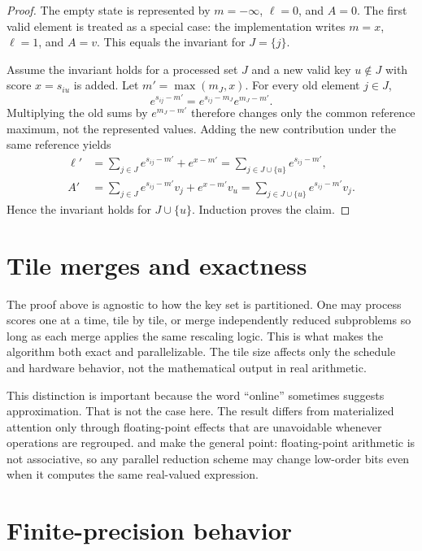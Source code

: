 \begin{proof}
The empty state is represented by $m=-\infty$, $\ell=0$, and $A=0$. The first valid element is treated as a special case: the implementation writes $m=x$, $\ell=1$, and $A=v$. This equals the invariant for $J=\{j\}$.

Assume the invariant holds for a processed set $J$ and a new valid key $u\notin J$ with score $x=s_{iu}$ is added. Let $m'=\max(m_J,x)$. For every old element $j\in J$,
\begin{equation}
  e^{s_{ij}-m'} = e^{s_{ij}-m_J} e^{m_J-m'}.
\end{equation}
Multiplying the old sums by $e^{m_J-m'}$ therefore changes only the common reference maximum, not the represented values. Adding the new contribution under the same reference yields
\begin{align}
  \ell' &= \sum_{j\in J} e^{s_{ij}-m'} + e^{x-m'}
        = \sum_{j\in J\cup\{u\}} e^{s_{ij}-m'}, \\
  A' &= \sum_{j\in J} e^{s_{ij}-m'} v_j + e^{x-m'} v_u
      = \sum_{j\in J\cup\{u\}} e^{s_{ij}-m'} v_j.
\end{align}
Hence the invariant holds for $J\cup\{u\}$. Induction proves the claim.
\end{proof}

\section{Tile merges and exactness}

The proof above is agnostic to how the key set is partitioned. One may process scores one at a time, tile by tile, or merge independently reduced subproblems so long as each merge applies the same rescaling logic. This is what makes the algorithm both exact and parallelizable. The tile size affects only the schedule and hardware behavior, not the mathematical output in real arithmetic.

This distinction is important because the word ``online'' sometimes suggests approximation. That is not the case here. The result differs from materialized attention only through floating-point effects that are unavoidable whenever operations are regrouped. \citet{goldberg1991floating} and \citet{higham2002accuracy} make the general point: floating-point arithmetic is not associative, so any parallel reduction scheme may change low-order bits even when it computes the same real-valued expression.

\section{Finite-precision behavior}

